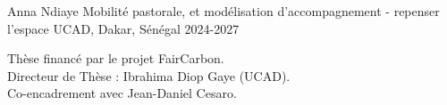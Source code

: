 
\vspace{2em}
\begin{cventries}
  \cventry
    {Anna Ndiaye} %
    {Mobilité pastorale, et modélisation d'accompagnement - repenser l'espace } %
    {UCAD, Dakar, Sénégal} %
    {2024-2027} %
    {
      \begin{cvitems} %
        Thèse financé par le projet FairCarbon.\\
        Directeur de Thèse : Ibrahima Diop Gaye (UCAD).\\
        Co-encadrement avec Jean-Daniel Cesaro.
      \end{cvitems}
  }


\end{cventries}
